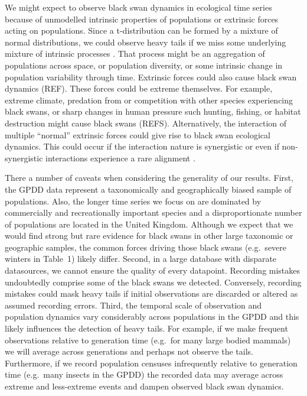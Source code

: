 We might expect to observe black swan dynamics in ecological time series because of unmodelled intrinsic properties of populations or extrinsic forces acting on populations. Since a t-distribution can be formed by a mixture of normal distributions, we could observe heavy tails if we miss some underlying mixture of intrinsic processes \citep{allen2001}. That process might be an aggregation of populations across space, or population diversity, or some intrinsic change in population variability through time. Extrinsic forces could also cause black swan dynamics (REF). These forces could be extreme themselves. For example, extreme climate, predation from or competition with other species experiencing black swans, or sharp changes in human pressure such hunting, fishing, or habitat destruction might cause black swans (REFS). Alternatively, the interaction of multiple ``normal'' extrinsic forces could give rise to black swan ecological dynamics. This could occur if the interaction nature is synergistic \citep[e.g.][]{kirby2009} or even if non-synergistic interactions experience a rare alignment \citep{denny2009}.

There a number of caveats when considering the generality of our results. First, the GPDD data represent a taxonomically and geographically biased sample of populations. Also, the longer time series we focus on are dominated by commercially and recreationally important species and a disproportionate number of populations are located in the United Kingdom. Although we expect that we would find strong but rare evidence for black swans in other large taxonomic or geographic samples, the common forces driving those black swans (e.g.~severe winters in Table~1) likely differ. Second, in a large database with disparate datasources, we cannot ensure the quality of every datapoint. Recording mistakes undoubtedly comprise some of the black swans we detected. Conversely, recording mistakes could mask heavy tails if initial observations are discarded or altered as assumed recording errors. Third, the temporal scale of observation and population dynamics vary considerably across populations in the GPDD and this likely influences the detection of heavy tails. For example, if we make frequent observations relative to generation time (e.g.~for many large bodied mammals) we will average across generations and perhaps not observe the tails. Furthermore, if we record population censuses infrequently relative to generation time (e.g.~many insects in the GPDD) the recorded data may average across extreme and less-extreme events and dampen observed black swan dynamics.


